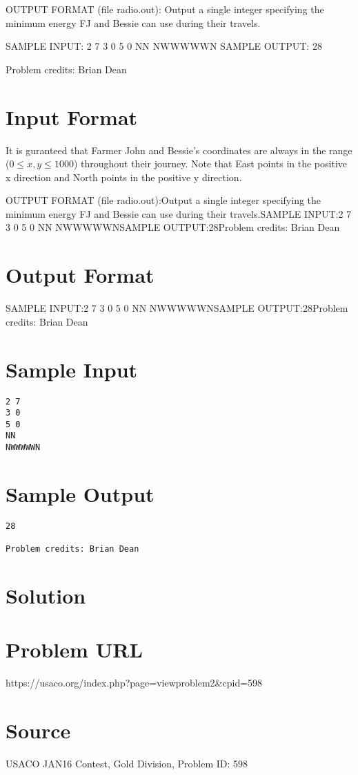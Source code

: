 \documentclass[12pt]{article}
\begin{document}
OUTPUT FORMAT (file radio.out):
Output a single integer specifying the minimum energy FJ and Bessie can use
during their travels.

SAMPLE INPUT:
2 7
3 0
5 0
NN
NWWWWWN
SAMPLE OUTPUT: 
28

Problem credits: Brian Dean



\section*{Input Format}
It is guranteed that Farmer John and Bessie's coordinates are always in the
range ($0 \leq x,y \leq 1000$) throughout their journey.  Note that East points in the positive x direction and North points in the positive y direction.

OUTPUT FORMAT (file radio.out):Output a single integer specifying the minimum energy FJ and Bessie can use
during their travels.SAMPLE INPUT:2 7
3 0
5 0
NN
NWWWWWNSAMPLE OUTPUT:28Problem credits: Brian Dean

\section*{Output Format}
SAMPLE INPUT:2 7
3 0
5 0
NN
NWWWWWNSAMPLE OUTPUT:28Problem credits: Brian Dean

\section*{Sample Input}
\begin{verbatim}
2 7
3 0
5 0
NN
NWWWWWN
\end{verbatim}

\section*{Sample Output}
\begin{verbatim}
28

Problem credits: Brian Dean
\end{verbatim}

\section*{Solution}


\section*{Problem URL}
https://usaco.org/index.php?page=viewproblem2&cpid=598

\section*{Source}
USACO JAN16 Contest, Gold Division, Problem ID: 598
\end{document}

